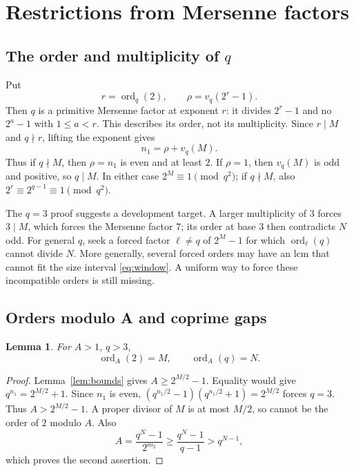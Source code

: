 \documentclass[11pt]{article}
\newtheorem{lemma}{Lemma}
\begin{document}
\section{Restrictions from Mersenne factors}
\label{sec:mersenne}

\subsection{\texorpdfstring{The order and multiplicity of $q$}{The order and multiplicity of q}}
Put
\[
r=\operatorname{ord}_q(2),\qquad \rho=v_q(2^r-1).
\]
Then $q$ is a primitive Mersenne factor at exponent $r$: it divides
$2^r-1$ and no $2^a-1$ with $1\leq a<r$.
This describes its order, not its multiplicity. Since $r\mid M$ and
$q\nmid r$, lifting the exponent gives
\begin{equation}\label{eq:exact-q-valuation}
\boxed{n_1=\rho+v_q(M).}
\end{equation}
Thus if $q\nmid M$, then $\rho=n_1$ is even and at least $2$.
If $\rho=1$, then $v_q(M)$ is odd and positive, so $q\mid M$.
In either case $2^M\equiv1\pmod{q^2}$; if $q\nmid M$, also
$2^r\equiv2^{q-1}\equiv1\pmod{q^2}$.

The $q=3$ proof suggests a development target. A larger multiplicity of
$3$ forces $3\mid M$, which forces the Mersenne factor $7$; its order at
base $3$ then contradicts $N$ odd. For general $q$, seek a forced factor
$\ell\neq q$ of $2^M-1$ for which $\operatorname{ord}_\ell(q)$ cannot
divide $N$. More generally, several forced orders may have an lcm that
cannot fit the size interval \eqref{eq:window}. A uniform way to force
these incompatible orders is still missing.

\subsection{Orders modulo A and coprime gaps}
\label{sec:exact-orders}
\begin{lemma}
For $A>1$, $q>3$,
\[
\operatorname{ord}_A(2)=M,\qquad \operatorname{ord}_A(q)=N.
\]
\end{lemma}
\begin{proof}
Lemma~\ref{lem:bounds} gives $A\geq2^{M/2}-1$.
Equality would give $q^{n_1}=2^{M/2}+1$. Since $n_1$ is even,
$(q^{n_1/2}-1)(q^{n_1/2}+1)=2^{M/2}$ forces $q=3$.
Thus $A>2^{M/2}-1$. A proper divisor of $M$ is at most $M/2$,
so cannot be the order of $2$ modulo $A$.
Also
\[
A=\frac{q^N-1}{2^{m_2}}\geq\frac{q^N-1}{q-1}>q^{N-1},
\]
which proves the second assertion.
\end{proof}
\end{document}
